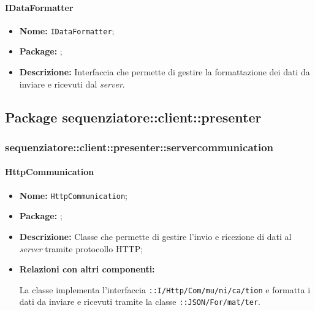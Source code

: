 \paragraph{IDataFormatter}
\begin{itemize}
\item \textbf{Nome:} \texttt{IDataFormatter};
\item \textbf{Package:} \texttt{\serverCommunication{}};
\item \textbf{Descrizione:} Interfaccia che permette di gestire la formattazione dei dati da inviare e ricevuti dal \textit{server}.
\end{itemize}

\subsection{Package sequenziatore::client::presenter}



\subsubsection{sequenziatore::client::presenter::servercommunication}

\paragraph{HttpCommunication}
\begin{flushleft}
\begin{itemize}
\item \textbf{Nome:} \texttt{HttpCommunication};
\item \textbf{Package:} \texttt{\serverCommunication{}};
\item \textbf{Descrizione:} Classe che permette di gestire l'invio e ricezione di dati al \textit{server} tramite protocollo HTTP;
\item \textbf{Relazioni con altri componenti:}
\begin{sloppypar}
La classe implementa l'interfaccia \texttt{\iServerCommunication{}::I\fshyp{}Http\fshyp{}Com\fshyp{}mu\fshyp{}ni\fshyp{}ca\fshyp{}tion} e formatta i dati da inviare e ricevuti tramite la classe \texttt{\serverCommunication{}::JSON\fshyp{}For\fshyp{}mat\fshyp{}ter}.
\end{sloppypar}
\end{itemize}
\end{flushleft}


